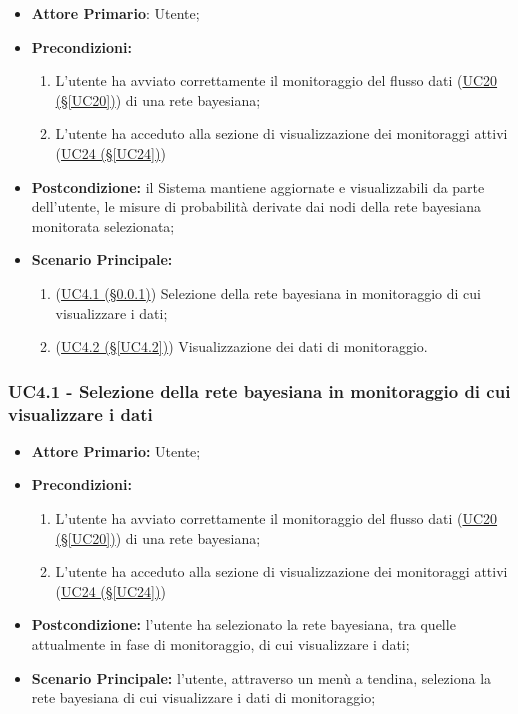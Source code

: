 \begin{itemize}
	\item \textbf{Attore Primario}: Utente;
	\item \textbf{Precondizioni:}
	\begin{enumerate}
		\item L'utente ha avviato correttamente il monitoraggio del flusso dati (\hyperref[UC20]{UC20 (§\ref*{UC20})}) di una rete bayesiana;
		\item L'utente ha acceduto alla sezione di visualizzazione dei monitoraggi attivi (\hyperref[UC24]{UC24 (§\ref*{UC24})})
	\end{enumerate}	 
	\item \textbf{Postcondizione:} il Sistema mantiene aggiornate e visualizzabili da parte dell'utente, le misure di probabilità derivate dai nodi della rete bayesiana monitorata selezionata;
	\item \textbf{Scenario Principale:} 
	\begin{enumerate}
		\item (\hyperref[UC4.1]{UC4.1 (§\ref*{UC4.1})}) Selezione della rete bayesiana in monitoraggio di cui visualizzare i dati;
		\item (\hyperref[UC4.2]{UC4.2 (§\ref*{UC4.2})}) Visualizzazione dei dati di monitoraggio.
	\end{enumerate}
\end{itemize}

\pagebreak

\subsubsection{UC4.1 - Selezione della rete bayesiana in monitoraggio di cui visualizzare i dati}\label{UC4.1}

\begin{itemize}
	\item \textbf{Attore Primario:} Utente;
	\item \textbf{Precondizioni:} 
	\begin{enumerate}
		\item L'utente ha avviato correttamente il monitoraggio del flusso dati (\hyperref[UC20]{UC20 (§\ref*{UC20})}) di una rete bayesiana;
		\item L'utente ha acceduto alla sezione di visualizzazione dei monitoraggi attivi (\hyperref[UC24]{UC24 (§\ref*{UC24})})
	\end{enumerate}	 
	\item \textbf{Postcondizione:} l'utente ha selezionato la rete bayesiana, tra quelle attualmente in fase di monitoraggio, di cui visualizzare i dati;
	\item \textbf{Scenario Principale:} l'utente, attraverso un menù a tendina, seleziona la rete bayesiana di cui visualizzare i dati di monitoraggio;
\end{itemize}

